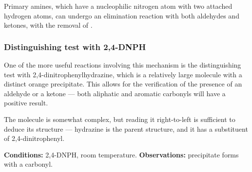 			Primary amines, which have a nucleophilic nitrogen atom with two attached hydrogen atoms, can undergo an elimination
			reaction with both aldehydes and ketones, with the removal of .


			\subsubsection{Distinguishing test with 2,4-DNPH}

				One of the more useful reactions involving this mechanism is the distinguishing test with 2,4-dinitrophenylhydrazine, which
				is a relatively large molecule with a distinct orange precipitate. This allows for the verification of the presence of
				an aldehyde or a ketone –– both aliphatic and aromatic carbonyls will have a positive result.

				The molecule is somewhat complex, but reading it right-to-left is sufficient to deduce its structure –– hydrazine is the parent
				structure, and it has a substituent of 2,4-dinitrophenyl.

				\vspace{1.5em}
				\vbox{\textbf{Conditions:}	\tabto{35mm}2,4-DNPH, room temperature.}	%
				\vbox{\textbf{Observations:} precipitate forms with a carbonyl.}


